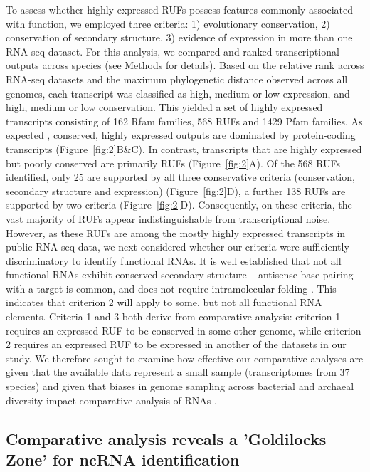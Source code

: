 \documentclass[10pt]{article}
\begin{document}
To assess whether highly expressed RUFs possess features commonly
associated with function, we employed three criteria: 1) evolutionary
conservation, 2) conservation of secondary structure, 3) evidence of
expression in more than one RNA-seq dataset. For this analysis, we
compared and ranked transcriptional outputs across species (see
Methods for details). Based on the relative rank across RNA-seq
datasets and the maximum phylogenetic distance observed across all
genomes, each transcript was classified as high, medium or low
expression, and high, medium or low conservation. This yielded a set
of highly expressed transcripts consisting of 162 Rfam families, 568
RUFs and 1429 Pfam families. As expected
\cite{Rocha:2003,Pal:2001,Drummond:2005}, conserved, highly expressed
outputs are dominated by protein-coding transcripts
(Figure~\ref{fig:2}B\&C). In contrast, transcripts that are highly
expressed but poorly conserved are primarily RUFs
(Figure~\ref{fig:2}A). Of the 568 RUFs identified, only 25 are
supported by all three conservative criteria (conservation, secondary
structure and expression) (Figure~\ref{fig:2}D), a further 138 RUFs
are supported by two criteria (Figure~\ref{fig:2}D). Consequently, on
these criteria, the vast majority of RUFs appear indistinguishable
from transcriptional noise. However, as these RUFs are among the
mostly highly expressed transcripts in public RNA-seq data, we next
considered whether our criteria were sufficiently discriminatory to
identify functional RNAs. It is well established that not all
functional RNAs exhibit conserved secondary structure – antisense base
pairing with a target is common, and does not require intramolecular
folding \cite{Gottesman:2011}. This indicates that criterion 2 will
apply to some, but not all functional RNA elements. Criteria 1 and 3
both derive from comparative analysis: criterion 1 requires an
expressed RUF to be conserved in some other genome, while criterion 2
requires an expressed RUF to be expressed in another of the datasets
in our study. We therefore sought to examine how effective our
comparative analyses are given that the available data represent a
small sample (transcriptomes from 37 species) and given that biases in
genome sampling across bacterial and archaeal diversity impact
comparative analysis of RNAs \cite{Hoeppner:2012}.

\subsection*{Comparative analysis reveals a 'Goldilocks Zone' for ncRNA identification}
\end{document}
